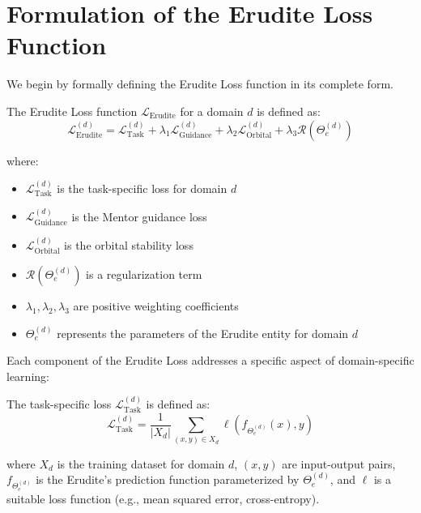 \section{Formulation of the Erudite Loss Function}

We begin by formally defining the Erudite Loss function in its complete form.

\begin{definition}
The Erudite Loss function $\mathcal{L}_{\text{Erudite}}$ for a domain $d$ is defined as:
\begin{equation}
\mathcal{L}_{\text{Erudite}}^{(d)} = \mathcal{L}_{\text{Task}}^{(d)} + \lambda_1 \mathcal{L}_{\text{Guidance}}^{(d)} + \lambda_2 \mathcal{L}_{\text{Orbital}}^{(d)} + \lambda_3 \mathcal{R}(\Theta_e^{(d)})
\end{equation}

where:
\begin{itemize}
    \item $\mathcal{L}_{\text{Task}}^{(d)}$ is the task-specific loss for domain $d$
    \item $\mathcal{L}_{\text{Guidance}}^{(d)}$ is the Mentor guidance loss
    \item $\mathcal{L}_{\text{Orbital}}^{(d)}$ is the orbital stability loss
    \item $\mathcal{R}(\Theta_e^{(d)})$ is a regularization term
    \item $\lambda_1, \lambda_2, \lambda_3$ are positive weighting coefficients
    \item $\Theta_e^{(d)}$ represents the parameters of the Erudite entity for domain $d$
\end{itemize}
\end{definition}

Each component of the Erudite Loss addresses a specific aspect of domain-specific learning:

\begin{definition}
The task-specific loss $\mathcal{L}_{\text{Task}}^{(d)}$ is defined as:
\begin{equation}
\mathcal{L}_{\text{Task}}^{(d)} = \frac{1}{|X_d|}\sum_{(x,y) \in X_d} \ell\left(f_{\Theta_e^{(d)}}(x), y\right)
\end{equation}

where $X_d$ is the training dataset for domain $d$, $(x,y)$ are input-output pairs, $f_{\Theta_e^{(d)}}$ is the Erudite's prediction function parameterized by $\Theta_e^{(d)}$, and $\ell$ is a suitable loss function (e.g., mean squared error, cross-entropy).
\end{definition}

